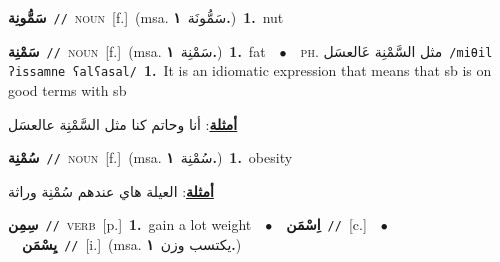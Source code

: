 \documentclass[10pt,a4paper,twoside]{article} %
\begin{document}
\begin{multicols}{2}
{\setlength\topsep{0pt}\textbf{\foreignlanguage{arabic}{سَمُّونِة}}\ {\color{gray}\texttt{//}\color{black}}\ \textsc{noun}\ [f.]\ \color{gray}(msa. \foreignlanguage{arabic}{سَمُّونَة}~\foreignlanguage{arabic}{\textbf{١.}})\color{black}\ \textbf{1.}~nut\ } \vspace{2mm}

{\setlength\topsep{0pt}\textbf{\foreignlanguage{arabic}{سَمْنِة}}\ {\color{gray}\texttt{//}\color{black}}\ \textsc{noun}\ [f.]\ \color{gray}(msa. \foreignlanguage{arabic}{سَمْنِة}~\foreignlanguage{arabic}{\textbf{١.}})\color{black}\ \textbf{1.}~fat\ \ $\bullet$\ \ \textsc{ph.} \color{gray} \foreignlanguage{arabic}{مثل السَّمْنِة عَالعسَل}\color{black}\ {\color{gray}\texttt{/{\sffamily miθil ʔissamne ʕalʕasal}/}\color{black}}\ \textbf{1.}~It is an idiomatic expression that means that sb is on good terms with sb\  \begin{flushright}\color{gray}\foreignlanguage{arabic}{\textbf{\underline{\foreignlanguage{arabic}{أمثلة}}}: أنا وحاتم كنا مثل السَّمْنِة عالعسَل}\end{flushright}\color{black}} \vspace{2mm}

{\setlength\topsep{0pt}\textbf{\foreignlanguage{arabic}{سُمْنِة}}\ {\color{gray}\texttt{//}\color{black}}\ \textsc{noun}\ [f.]\ \color{gray}(msa. \foreignlanguage{arabic}{سُمْنِة}~\foreignlanguage{arabic}{\textbf{١.}})\color{black}\ \textbf{1.}~obesity\  \begin{flushright}\color{gray}\foreignlanguage{arabic}{\textbf{\underline{\foreignlanguage{arabic}{أمثلة}}}: العيلة هاي عندهم سُمْنِة وراثة}\end{flushright}\color{black}} \vspace{2mm}

{\setlength\topsep{0pt}\textbf{\foreignlanguage{arabic}{سِمِن}}\ {\color{gray}\texttt{//}\color{black}}\ \textsc{verb}\ [p.]\ \textbf{1.}~gain a lot weight\ \ $\bullet$\ \ \setlength\topsep{0pt}\textbf{\foreignlanguage{arabic}{اِسْمَن}}\ {\color{gray}\texttt{//}\color{black}}\ [c.]\ \ $\bullet$\ \ \setlength\topsep{0pt}\textbf{\foreignlanguage{arabic}{يِسْمَن}}\ {\color{gray}\texttt{//}\color{black}}\ [i.]\ \color{gray}(msa. \foreignlanguage{arabic}{يكتسب وزن}~\foreignlanguage{arabic}{\textbf{١.}})\color{black}\ } \vspace{2mm}


\end{multicols}
\end{document}
